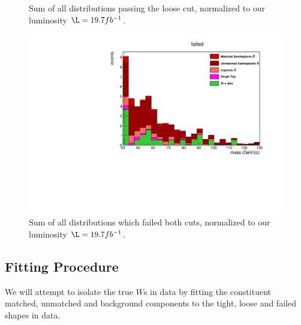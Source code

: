 \begin{}[h!]
\begin{figure}[h!]
\caption{Sum of all distributions passing the loose cut, normalized to our luminosity $\L = 19.7 fb^{-1}$.}\label{fig:looseHIST}
\end{figure}
\begin{figure}[h!]
\centering
\includegraphics[scale=0.66]{figs/WtagSF/TOTAL_FAIL.pdf}
\caption{Sum of all distributions which failed both cuts, normalized to our luminosity $\L = 19.7 fb^{-1}$. }\label{fig:failedHIST}
\end{figure}
\subsection{Fitting Procedure}
We will attempt to isolate the true $W$s in data by fitting the constituent matched, unmatched and background components to the tight, loose and failed shapes in data.

\end{}
